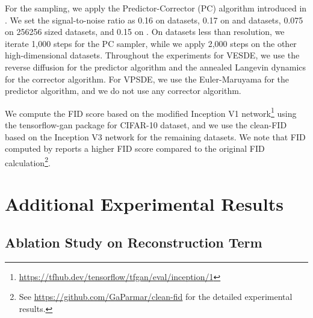 \documentclass[nohyperref]{article}
\theoremstyle{plain}
\theoremstyle{definition}
\theoremstyle{remark}
\begin{document}
	For the sampling, we apply the Predictor-Corrector (PC) algorithm introduced in \citet{song2020score}. We set the signal-to-noise ratio as 0.16 on  datasets, 0.17 on  and  datasets, 0.075 on 256256 sized datasets, and 0.15 on . On datasets less than  resolution, we iterate 1,000 steps for the PC sampler, while we apply 2,000 steps on the other high-dimensional datasets. Throughout the experiments for VESDE, we use the reverse diffusion \citep{song2020score} for the predictor algorithm and the annealed Langevin dynamics \citep{welling2011bayesian} for the corrector algorithm. For VPSDE, we use the Euler-Maruyama for the predictor algorithm, and we do not use any corrector algorithm.
	
	We compute the FID score \citep{song2020score} based on the modified Inception V1 network\footnote{\url{https://tfhub.dev/tensorflow/tfgan/eval/inception/1}} using the tensorflow-gan package for CIFAR-10 dataset, and we use the clean-FID \citep{parmar2021buggy} based on the Inception V3 network \citep{szegedy2016rethinking} for the remaining datasets. We note that FID computed by \cite{parmar2021buggy} reports a higher FID score compared to the original FID calculation\footnote{See \url{https://github.com/GaParmar/clean-fid} for the detailed experimental results.}.
	
\section{Additional Experimental Results}\label{sec:additional}
		
		\subsection{Ablation Study on Reconstruction Term}\label{sec:reconstruction_training}
	
\end{document}
